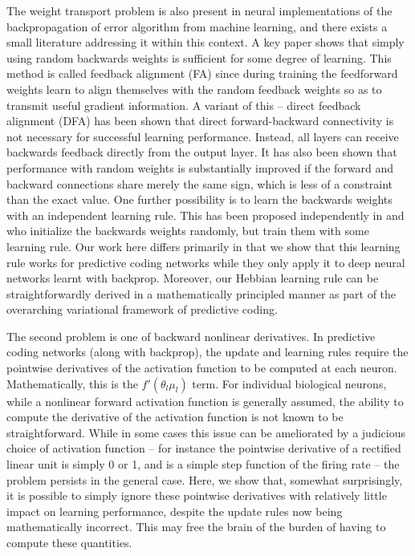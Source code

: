 The weight transport problem is also present in neural implementations of the backpropagation of error algorithm from machine learning, and there exists a small literature addressing it within this context. A key paper \citep{lillicrap2014random,lillicrap2016random} shows that simply using random backwards weights is sufficient for some degree of learning. This method is called feedback alignment (FA) since during training the feedforward weights learn to align themselves with the random feedback weights so as to transmit useful gradient information. A variant of this -- direct feedback alignment (DFA) \citep{nokland2016direct} has been shown that direct forward-backward connectivity is not necessary for successful learning performance. Instead, all layers can receive backwards feedback directly from the output layer. It has also been shown \citep{liao2016important} that performance with random weights is substantially improved if the forward and backward connections share merely the same sign, which is less of a constraint than the exact value. One further possibility is to learn the backwards weights with an independent learning rule. This has been proposed independently in \citet{amit2019deep} and \citet{akrout2019deep} who initialize the backwards weights randomly, but train them with some learning rule. Our work here differs primarily in that we show that this learning rule works for predictive coding networks while they only apply it to deep neural networks learnt with backprop. Moreover, our Hebbian learning rule can be straightforwardly derived in a mathematically principled manner as part of the overarching variational framework of predictive coding. 

The second problem is one of backward nonlinear derivatives. In predictive coding networks (along with backprop), the update and learning rules require the pointwise derivatives of the activation function to be computed at each neuron. Mathematically, this is the $f'(\theta_l \mu_l)$ term. For individual biological neurons, while a nonlinear forward activation function is generally assumed, the ability to compute the derivative of the activation function is not known to be straightforward. While in some cases this issue can be ameliorated by a judicious choice of activation function -- for instance the pointwise derivative of a rectified linear unit is simply 0 or 1, and is a simple step function of the firing rate -- the problem persists in the general case. Here, we show that, somewhat surprisingly, it is possible to simply ignore these pointwise derivatives with relatively little impact on learning performance, despite the update rules now being mathematically incorrect. This may free the brain of the burden of having to compute these quantities.

